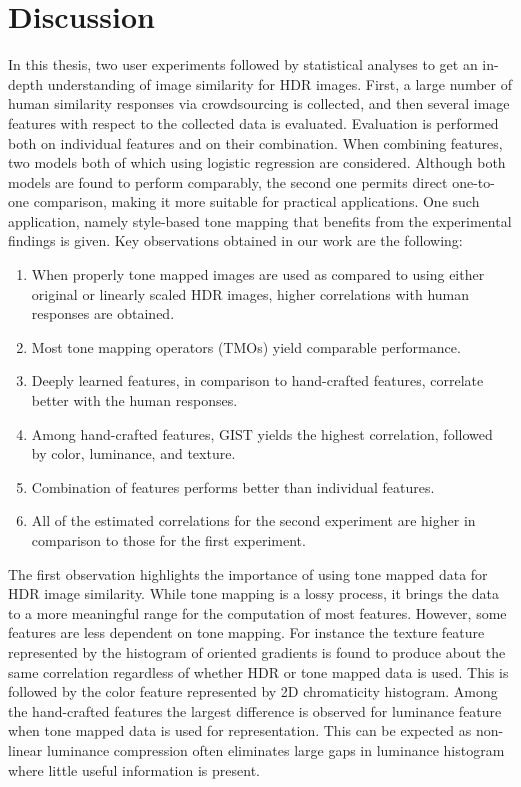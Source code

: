 \chapter{Discussion}
\label{chp:b6}

In this thesis, two user experiments followed by statistical analyses to get an in-depth understanding of image similarity for HDR
images. First, a large number of human similarity responses via crowdsourcing is collected, and then several image features with respect to the collected data is evaluated. Evaluation is performed both on individual features and on their combination. When combining features, two models both of which using logistic regression are considered. Although both models are found to perform comparably, the second one permits direct one-to-one comparison, making it more suitable for practical applications. One such application, namely style-based tone mapping that benefits from the experimental findings is given. Key observations obtained in our work are the following:
%
\begin{enumerate}
\item When properly tone mapped images are used as compared to using either original or linearly scaled HDR images, higher correlations with human responses are obtained.
\item Most tone mapping operators (TMOs) yield comparable performance.
\item Deeply learned features, in comparison to hand-crafted features, correlate better with the human responses.
\item Among hand-crafted features, GIST yields the highest correlation, followed by color, luminance, and texture.
\item Combination of features performs better than individual features.
\item All of the estimated correlations for the second experiment are higher in comparison to those for the first experiment.
\end{enumerate}

The first observation highlights the importance of using tone mapped data for HDR image similarity. While tone mapping is a lossy process, it brings the data to a more meaningful range for the computation of most features. However, some features are less dependent on tone mapping. For instance the texture feature represented by the histogram of oriented gradients is found to produce about the same correlation regardless of whether HDR or tone mapped data is used. This is followed by the color feature represented by 2D chromaticity histogram. Among the hand-crafted features the largest difference is  observed for luminance feature when tone mapped data is used for representation. This can be expected as non-linear luminance compression often eliminates large gaps in luminance histogram where little useful information is present.

